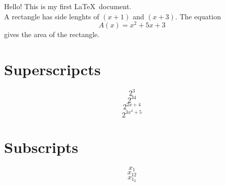 \documentclass[a4paper,12 pt]{article}
\begin{document}
Hello! This is my first \LaTeX\ document. \\
A rectangle has side lenghts of $(x+1)$ and $(x+3)$.
The equation $${A(x)=x^2+5x+3}$$ gives the area of the rectangle.
\section{Superscripcts}
$$2^3$$
$$2^{34}$$
$$2^{2x+4}$$
$$2^{3x^4+5}$$
\section{Subscripts}
$$x_1$$
$$x_{12}$$
$$x_{1_2}$$
\end{document}
